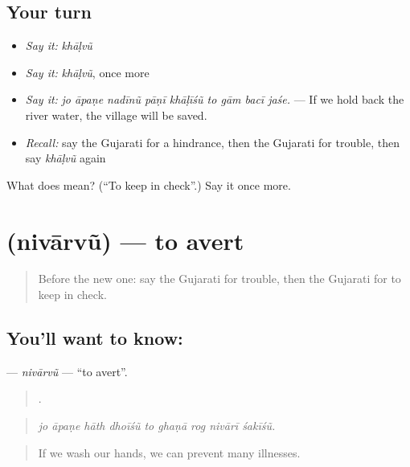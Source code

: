 \subsection*{Your turn}
\begin{itemize}
\raggedright
  \item \emph{Say it:} \emph{khāḷvũ}
  \item \emph{Say it:} \emph{khāḷvũ}, once more
  \item \emph{Say it:} \emph{jo āpaṇe nadīnũ pāṇī khāḷīśũ to gām bacī jaśe.} — If we hold back the river water, the village will be saved.
  \item \emph{Recall:} say the Gujarati for a hindrance, then the Gujarati for trouble, then say \emph{khāḷvũ} again
\end{itemize}

\begin{tcolorbox}[breakable,colback=teal!4,colframe=teal!35!black,title={Before you move on}]
What does  mean? (\textquotedblleft{}To keep in check\textquotedblright{}.) Say it once more.
\end{tcolorbox}
\section[\texorpdfstring{\gu{નિવારવું} (nivārvũ)}{નિવારવું (nivārvũ)}]{ (nivārvũ) — to avert}

\label{lesson:GU-C374-nivarvu}



\begin{quote}
Before the new one: say the Gujarati for trouble, then the Gujarati for to keep in check.
\end{quote}

\subsection*{You'll want to know: }
\textbf{} — \emph{nivārvũ} — \textquotedblleft{}to avert\textquotedblright{}.

\begin{quote}
        .
\end{quote}

\begin{quote}
\emph{jo āpaṇe hāth dhoīśũ to ghaṇā rog nivārī śakīśũ.}
\end{quote}

\begin{quote}
If we wash our hands, we can prevent many illnesses.
\end{quote}

